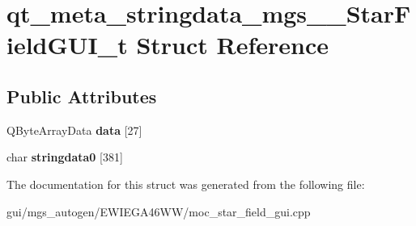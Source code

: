 \hypertarget{structqt__meta__stringdata__mgs____StarFieldGUI__t}{}\section{qt\+\_\+meta\+\_\+stringdata\+\_\+mgs\+\_\+\+\_\+\+Star\+Field\+G\+U\+I\+\_\+t Struct Reference}
\label{structqt__meta__stringdata__mgs____StarFieldGUI__t}
\subsection*{Public Attributes}
\begin{DoxyCompactItemize}
\item 
\mbox{\label{structqt__meta__stringdata__mgs____StarFieldGUI__t_a4e485ef7da8abd87767ea6530322b3c0}} 
Q\+Byte\+Array\+Data {\bfseries data} \mbox{[}27\mbox{]}
\item 
\mbox{\label{structqt__meta__stringdata__mgs____StarFieldGUI__t_ae808e1c51b536fd13579c94097060dee}} 
char {\bfseries stringdata0} \mbox{[}381\mbox{]}
\end{DoxyCompactItemize}


The documentation for this struct was generated from the following file\+:\begin{DoxyCompactItemize}
\item 
gui/mgs\+\_\+autogen/\+E\+W\+I\+E\+G\+A46\+W\+W/moc\+\_\+star\+\_\+field\+\_\+gui.\+cpp\end{DoxyCompactItemize}
